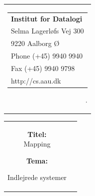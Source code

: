 \thispagestyle{empty}
\begin{titlepage}
\setlength{\textwidth}{15cm}
	\noindent
\begin{nopagebreak}
{\samepage 
\begin{tabular}{r}
	\parbox{15cm}{
	\hfill \parbox{7cm}{\begin{tabular}{l}
		{\small \textbf{Institut for Datalogi}}\\
		{\small Selma Lagerløfs Vej 300} \\
		{\small 9220 Aalborg Ø} \\
		{\small Phone (+45) 9940 9940} \\
		{\small Fax (+45) 9940 9798} \\
		{\small http://cs.aau.dk}
	\end{tabular}}
.	}
\end{tabular}

\begin{tabular}{cc}
	\parbox{8cm}{
	\begin{description}
		\item { \textbf{Titel:}}\\ 
			Mapping
    		\item { \textbf{Tema:}}\\ 
			\raggedright Indlejrede systemer
	\end{description}
	
}
\end{tabular}}
\end{nopagebreak}
\end{titlepage}
